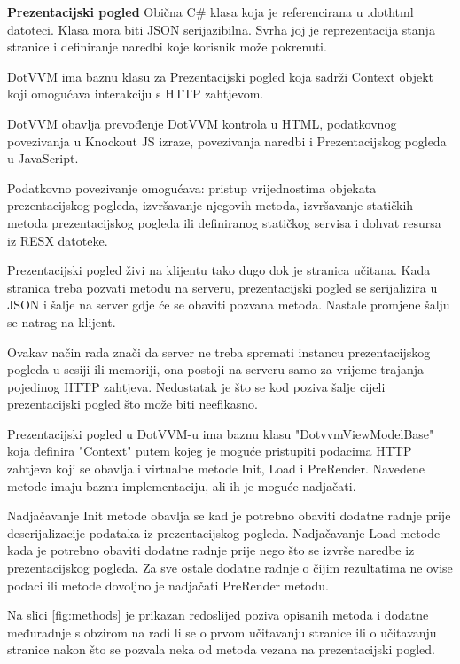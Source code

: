 \documentclass[times, utf8, diplomski]{fer}
\begin{document}
\hfill\break
\textbf{Prezentacijski pogled }
Obična C\# klasa koja je referencirana u .dothtml datoteci. Klasa mora biti JSON serijazibilna. Svrha joj je reprezentacija stanja stranice i definiranje naredbi koje korisnik može pokrenuti.

DotVVM ima baznu klasu za Prezentacijski pogled koja sadrži Context objekt koji omogućava interakciju s HTTP zahtjevom. 

\hfill\break
DotVVM obavlja prevođenje DotVVM kontrola u HTML, podatkovnog povezivanja  u Knockout JS izraze, povezivanja naredbi  i Prezentacijskog pogleda u JavaScript.

Podatkovno povezivanje omogućava: pristup vrijednostima objekata prezentacijskog pogleda, izvršavanje njegovih metoda, izvršavanje statičkih metoda prezentacijskog pogleda ili definiranog statičkog servisa i dohvat resursa iz RESX datoteke.

Prezentacijski pogled živi na klijentu tako dugo dok je stranica učitana. Kada stranica treba pozvati metodu na serveru, prezentacijski pogled se serijalizira u JSON i šalje na server gdje će se obaviti pozvana metoda. Nastale promjene šalju se natrag na klijent. 

Ovakav način rada znači da server ne treba spremati instancu prezentacijskog pogleda u sesiji ili memoriji, ona postoji na serveru samo za vrijeme trajanja pojedinog HTTP zahtjeva. Nedostatak je što se kod poziva šalje cijeli prezentacijski pogled što može biti neefikasno.

Prezentacijski pogled u DotVVM-u ima baznu klasu "DotvvmViewModelBase" koja definira "Context" putem kojeg je moguće pristupiti podacima HTTP zahtjeva koji se obavlja i virtualne metode Init, Load i PreRender. Navedene metode imaju baznu implementaciju, ali ih je moguće nadjačati. 

Nadjačavanje Init metode obavlja se kad je potrebno obaviti dodatne radnje prije deserijalizacije podataka iz prezentacijskog pogleda. Nadjačavanje Load metode kada je potrebno obaviti dodatne radnje prije nego što se izvrše naredbe iz prezentacijskog pogleda. Za sve ostale dodatne radnje o čijim rezultatima ne ovise podaci ili metode dovoljno je nadjačati PreRender metodu.

Na slici \ref{fig:methods} je prikazan redoslijed poziva opisanih metoda i dodatne međuradnje s obzirom na radi li se o prvom učitavanju stranice ili o učitavanju stranice nakon što se pozvala neka od metoda vezana na prezentacijski pogled.
\end{document}
